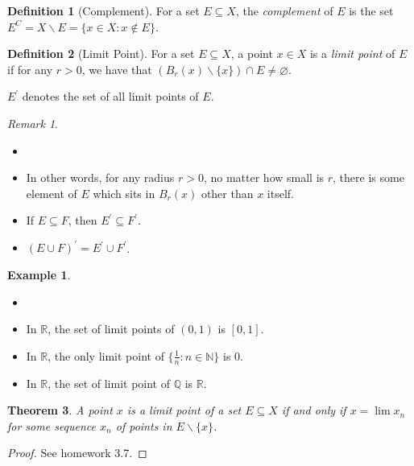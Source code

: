 \documentclass[12pt, lettersize]{article}
\theoremstyle{plain}
\newtheorem{thm}{Theorem}[section]
\theoremstyle{definition}
\newtheorem{dfn}[thm]{Definition}
\newtheorem*{eg}{Example}
\theoremstyle{remark}
\newtheorem*{rem}{Remark}
\newcommand{\R}{\mathbb{R}}
\newcommand{\N}{\mathbb{N}}
\newcommand{\Q}{\mathbb{Q}}
\let\emptyset\varnothing
\begin{document}
\begin{dfn}[Complement]
	For a set $E\subseteq X$, the \emph{complement} of $E$ is the set $E^C=X\backslash E=\{x\in X: x\notin E\}$.
\end{dfn}

\begin{dfn}[Limit Point]
	For a set $E\subseteq X$, a point $x\in X$ is a \emph{limit point} of $E$ if for any $r>0$, we have that $(B_r(x)\backslash\{x\})\cap E\neq\emptyset$.\smallskip
	
	$E^\prime$ denotes the set of all limit points of $E$.
\end{dfn}
\begin{rem}
	\begin{itemize}
		\item[]
		\item In other words, for any radius $r>0$, no matter how small is $r$, there is some element of $E$ which sits in $B_r(x)$ other than $x$ itself. 
		\item If $E\subseteq F$, then $E^\prime\subseteq F^\prime$.
		\item $(E\cup F)^\prime=E^\prime\cup F^\prime$.
	\end{itemize}
\end{rem}
\begin{eg}
	\begin{itemize}
		\item[]
		\item In $\R$, the set of limit points of $(0,1)$ is $[0,1]$.
		\item In $\R$, the only limit point of $\{\frac{1}{n}: n\in\N\}$ is $0$.
		\item In $\R$, the set of limit point of $\Q$ is $\R$. 
	\end{itemize}
\end{eg}

\begin{thm}
	A point $x$ is a limit point of a set $E\subseteq X$ if and only if $x=\lim x_n$ for some sequence $x_n$ of points in $E\backslash\{x\}$. 
\end{thm}
\begin{proof}
	See homework 3.7.
\end{proof}
\end{document}
